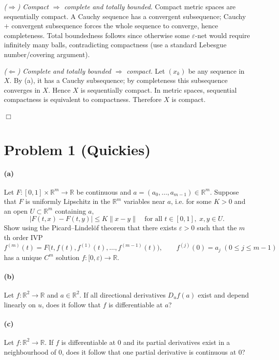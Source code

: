 \documentclass[12pt,a4paper]{article}
\theoremstyle{plain}
\theoremstyle{definition}
\theoremstyle{remark}
\theoremstyle{remark}
\begin{document}
\emph{($\Rightarrow$) Compact $\Rightarrow$ complete and totally bounded.}
Compact metric spaces are sequentially compact. A Cauchy sequence has a convergent subsequence;
Cauchy $+$ convergent subsequence forces the whole sequence to converge, hence completeness.
Total boundedness follows since otherwise some $\varepsilon$-net would require infinitely many balls,
contradicting compactness (use a standard Lebesgue number/covering argument).

\medskip

\emph{($\Leftarrow$) Complete and totally bounded $\Rightarrow$ compact.}
Let $(x_k)$ be any sequence in $X$. By (a), it has a Cauchy subsequence; by completeness this subsequence converges in $X$.
Hence $X$ is sequentially compact. In metric spaces, sequential compactness is equivalent to compactness.
Therefore $X$ is compact.

\hfill$\Box$

\section*{Problem 1 (Quickies)}

\paragraph{(a)}
Let $F:[0,1]\times\mathbb{R}^m\to\mathbb{R}$ be continuous and 
$a=(a_0,\dots,a_{m-1})\in\mathbb{R}^m$.
Suppose that $F$ is uniformly Lipschitz in the $\mathbb{R}^m$ variables near $a$, 
i.e. for some $K>0$ and an open $U\subset\mathbb{R}^m$ containing $a$,
\[
|F(t,x)-F(t,y)|\le K\|x-y\|\quad\text{for all }t\in[0,1],\;x,y\in U.
\]
Show using the Picard–Lindelöf theorem that there exists $\varepsilon>0$ such that
the $m$th order IVP
\[
f^{(m)}(t)=F\bigl(t,f(t),f^{(1)}(t),\ldots,f^{(m-1)}(t)\bigr),\qquad
f^{(j)}(0)=a_j\;(0\le j\le m-1)
\]
has a unique $C^m$ solution $f:[0,\varepsilon)\to\mathbb{R}$.

\paragraph{(b)}
Let $f:\mathbb{R}^2\to\mathbb{R}$ and $a\in\mathbb{R}^2$.
If all directional derivatives $D_u f(a)$ exist and depend linearly on $u$, 
does it follow that $f$ is differentiable at $a$?

\paragraph{(c)}
Let $f:\mathbb{R}^2\to\mathbb{R}$.
If $f$ is differentiable at $0$ and its partial derivatives exist in a neighbourhood of $0$,
does it follow that one partial derivative is continuous at $0$?
\end{document}
